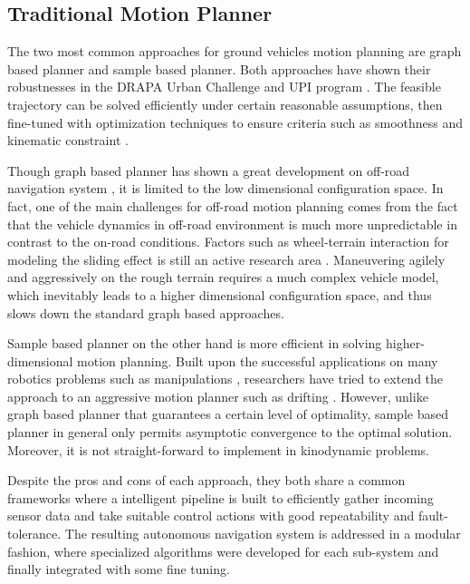 \documentclass[../thesis.tex]{subfiles}
\begin{document}
\subsection{Traditional Motion Planner}


The two most common approaches for ground vehicles motion planning are graph based planner and sample based planner. 
Both approaches have shown their robustnesses in the DRAPA Urban Challenge \cite{koenig2002d,kuwata2008motion} and UPI program \cite{kelly2006toward,stentz2007crusher}. The feasible trajectory can be solved efficiently under certain reasonable assumptions, then fine-tuned with optimization techniques to ensure criteria such as smoothness and kinematic constraint \cite{dolgov2008practical}.


Though graph based planner has shown a great development on off-road navigation system \cite{kelly2006toward,stentz2007crusher}, it is limited to the low dimensional configuration space.
In fact, one of the main challenges for off-road motion planning comes from the fact that the vehicle dynamics in off-road environment is much more unpredictable in contrast to the on-road conditions. 
Factors such as wheel-terrain interaction for modeling the sliding effect is still an active research area \cite{shibly2005equivalent,rubinstein2004detailed}. 
Maneuvering agilely and aggressively on the rough terrain requires a much complex vehicle model, which inevitably leads to a higher dimensional configuration space, and thus slows down the standard graph based approaches. 

Sample based planner on the other hand is more efficient in solving higher-dimensional motion planning. 
Built upon the successful applications on many robotics problems such as manipulations \cite{kuffner2000rrt}, researchers have tried to extend the approach to an aggressive motion planner such as drifting \cite{hwan2011anytime}. 
However, unlike graph based planner that guarantees a certain level of optimality, sample based planner in general only permits asymptotic convergence to the optimal solution. Moreover, it is not straight-forward to implement in kinodynamic problems.


Despite the pros and cons of each approach, they both share a common frameworks where a intelligent pipeline is built to efficiently gather incoming sensor data and take suitable control actions with good repeatability and fault-tolerance. 
The resulting autonomous navigation system is addressed in a modular fashion, where specialized algorithms were developed for each sub-system and finally integrated with some fine tuning.
\end{document}
